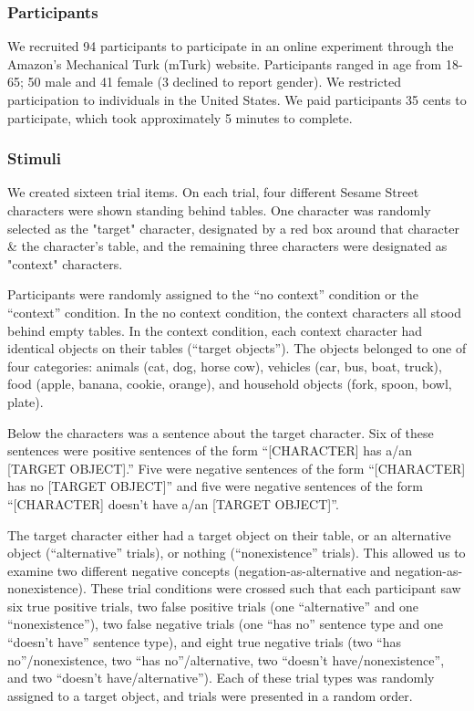 \documentclass[10pt,letterpaper]{article}
\begin{document}
\subsubsection{Participants}
We recruited 94 participants to participate in an online experiment through the Amazon's Mechanical Turk (mTurk) website.  Participants ranged in age from 18-65; 50 male and 41 female (3 declined to report gender).  We restricted participation to individuals in the United States. We paid participants 35 cents to participate, which took approximately 5 minutes to complete.  


\subsubsection{Stimuli}
We created sixteen trial items.  On each trial, four different Sesame Street characters were shown standing behind tables.  One character was randomly selected as the "target" character, designated by a red box around that character \& the character's table, and the remaining three characters were designated as "context" characters.

Participants were randomly assigned to the ``no context'' condition or the ``context'' condition.  In the no context condition, the context characters all stood behind empty tables.  In the context condition, each context character had identical objects on their tables (``target objects'').  The objects belonged to one of four categories: animals (cat, dog, horse cow), vehicles (car, bus, boat, truck), food (apple, banana, cookie, orange), and household objects (fork, spoon, bowl, plate).  

Below the characters was a sentence about the target character.  Six of these sentences were positive sentences of the form ``[CHARACTER] has a/an [TARGET OBJECT].''  Five were negative sentences of the form ``[CHARACTER] has no [TARGET OBJECT]'' and five were negative sentences of the form ``[CHARACTER] doesn't have a/an [TARGET OBJECT]''.  

The target character either had a target object on their table, or an alternative object (``alternative'' trials), or nothing (``nonexistence'' trials).  This allowed us to examine two different negative concepts (negation-as-alternative and negation-as-nonexistence).  These trial conditions were crossed such that each participant saw six true positive trials, two false positive trials (one ``alternative'' and one ``nonexistence''), two false negative trials (one ``has no'' sentence type and one ``doesn't have'' sentence type), and eight true negative trials (two ``has no''/nonexistence, two ``has no''/alternative, two ``doesn't have/nonexistence'', and two ``doesn't have/alternative'').  Each of these trial types was randomly assigned to a target object, and trials were presented in a random order.
\end{document}
